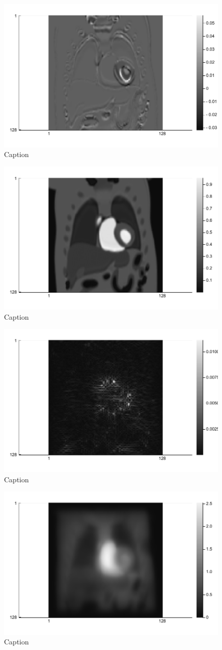 \begin{figure}
    \centering
    \includegraphics[width=0.46\linewidth]{images/PINCAT_diff_t20.pdf}
    \caption{Caption}
    \label{fig:PINCAT_diff_t20}
\end{figure}

\begin{figure}
    \centering
    \includegraphics[width=0.46\linewidth]{images/PINCAT_IRLS_recon.pdf}
    \caption{Caption}
    \label{fig:PINCAT_IRLS_recon}
\end{figure}

\begin{figure}
    \centering
    \includegraphics[width=0.46\linewidth]{images/PINCAT_IRLS_recon_error.pdf}
    \caption{Caption}
    \label{fig:PINCAT_IRLS_recon_error}
\end{figure}

\begin{figure}
    \centering
    \includegraphics[width=0.46\linewidth]{images/PINCAT_MSLR_recon.pdf}
    \caption{Caption}
    \label{fig:PINCAT_MSLR_recon}
\end{figure}

